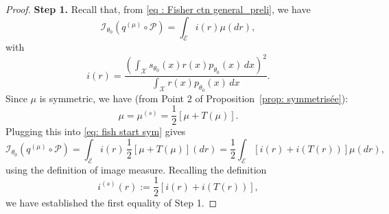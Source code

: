 \documentclass[a4paper, 11pt]{article}
\theoremstyle{definition}
\begin{document}
{\begin{proof}
\noindent \textbf{Step 1.} Recall that, from \eqref{eq : Fisher ctn general_preli}, we have
\begin{equation}\label{eq: fish start sym}
  \mathcal{I}_{\theta_0}(q^{(\mu)} \circ \mathcal{P}) = \int_\mathcal{E} i(r) \mu(dr),
\end{equation}
with
\[
i(r) = \frac{\left( \int_\mathcal{X} s_{\theta_0}(x) r(x) p_{\theta_0}(x) \, dx \right)^2}{\int_\mathcal{X} r(x) p_{\theta_0}(x) \, dx}.
\]
Since $\mu$ is symmetric, we have (from Point 2 of Proposition~\ref{prop: symmetrisée}):
\[
\mu = \mu^{(s)} = \frac{1}{2}[\mu + T(\mu)].
\]
Plugging this into \eqref{eq: fish start sym} gives
\begin{equation}\label{eq: fish step 1 3}
  \mathcal{I}_{\theta_0}(q^{(\mu)} \circ \mathcal{P}) = \int_\mathcal{E} i(r) \, \frac{1}{2}[\mu + T(\mu)](dr) = \frac{1}{2} \int_\mathcal{E} [i(r) + i(T(r))] \mu(dr),
\end{equation}
using the definition of image measure. Recalling the definition
\[
i^{(s)}(r) := \frac{1}{2}[i(r) + i(T(r))],
\]
we have established the first equality of Step 1.


\end{proof}}
\end{document}
